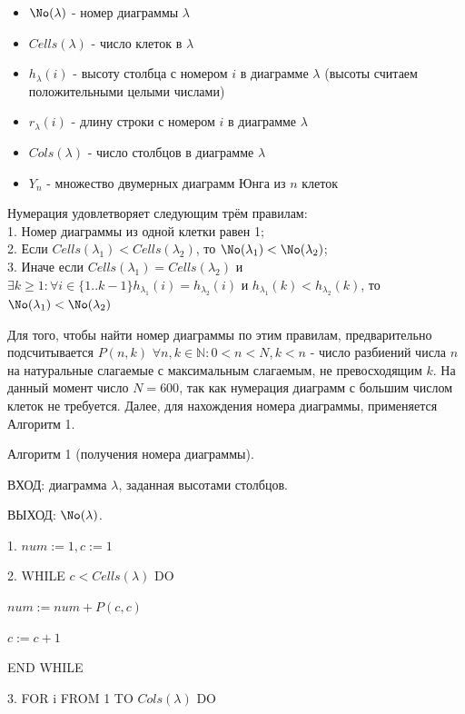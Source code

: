 \documentclass[12pt]{report}
\begin{document}
\begin{itemize}
  \item $\No(\lambda)$  - номер диаграммы $\lambda$
  \item $Cells(\lambda)$  - число клеток в $\lambda$
  \item $h_\lambda(i)$ - высоту столбца с номером $i$ в диаграмме $\lambda$ (высоты считаем положительными целыми числами)
  \item $r_\lambda(i)$ - длину строки с номером $i$ в диаграмме $\lambda$
  \item $Cols(\lambda)$ - число столбцов в диаграмме $\lambda$
  \item $Y_n$ - множество двумерных диаграмм Юнга из $n$ клеток
\end{itemize}
Нумерация удовлетворяет следующим трём правилам:\\
1. Номер диаграммы из одной клетки равен 1;\\
2. Если $Cells(\lambda_1) < Cells(\lambda_2)$, то $\No(\lambda_1) < \No(\lambda_2)$;\\
3. Иначе если $Cells(\lambda_1) = Cells(\lambda_2)$ и $\exists k \ge 1 : \forall i \in \{1..k-1\} h_{\lambda_1}(i) = h_{\lambda_2}(i)$ и $h_{\lambda_1}(k) < h_{\lambda_2}(k)$, то $\No(\lambda_1) < \No(\lambda_2)$

Для того, чтобы найти номер диаграммы по этим правилам, предварительно подсчитывается $P(n, k)$ $\forall n, k \in \mathbb{N} : 0 < n < N, k < n$ - число разбиений числа $n$ на натуральные слагаемые с максимальным слагаемым, не превосходящим $k$. На данный момент число $N = 600$, так как нумерация диаграмм с большим числом клеток не требуется. Далее, для нахождения номера диаграммы, применяется Алгоритм 1.
\vspace{1cm}

Алгоритм 1 (получения номера диаграммы).

ВХОД: диаграмма $\lambda$, заданная высотами столбцов.

ВЫХОД: $\No(\lambda)$.

1. $num := 1, c := 1$ 

2. WHILE $c < Cells(\lambda)$ DO 

\hspace{1cm} $num := num + P(c, c)$

\hspace{1cm} $c := c + 1$

\hspace{0.35cm} END WHILE

3. FOR i FROM 1 TO $Cols(\lambda)$ DO
\end{document}

